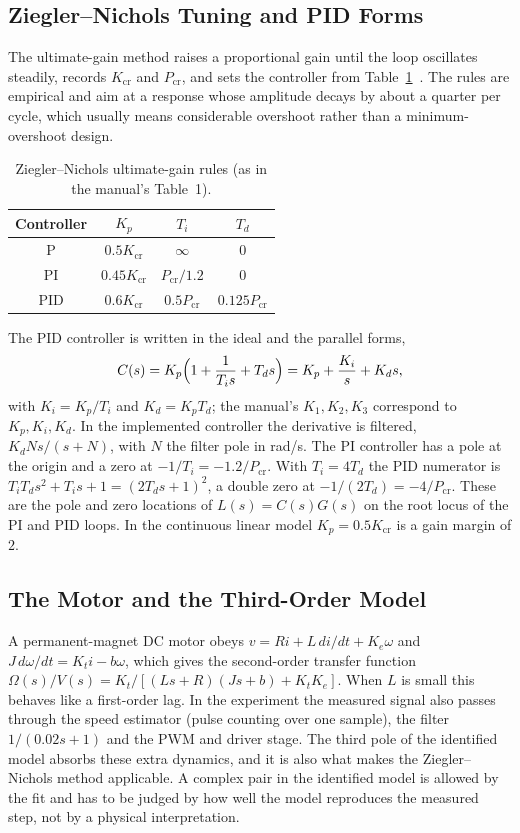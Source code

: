 \documentclass[lettersize,journal]{IEEEtran}
\newcommand{\Kcr}{K_{\mathrm{cr}}}
\newcommand{\Pcr}{P_{\mathrm{cr}}}
\begin{document}
\subsection{Ziegler--Nichols Tuning and PID Forms}
The ultimate-gain method raises a proportional gain until the loop oscillates steadily, records $\Kcr$ and $\Pcr$, and sets the controller from Table~\ref{tab:zn_rules}~\cite{zn,ogata}. The rules are empirical and aim at a response whose amplitude decays by about a quarter per cycle, which usually means considerable overshoot rather than a minimum-overshoot design.
\begin{table}[H]
\centering
\caption{Ziegler--Nichols ultimate-gain rules (as in the manual's Table~1).}
\label{tab:zn_rules}
\begin{tabular}{@{}cccc@{}}
\toprule
Controller & $K_p$ & $T_i$ & $T_d$ \\
\midrule
P   & $0.5\Kcr$  & $\infty$ & $0$ \\
PI  & $0.45\Kcr$ & $\Pcr/1.2$ & $0$ \\
PID & $0.6\Kcr$  & $0.5\Pcr$ & $0.125\Pcr$ \\
\bottomrule
\end{tabular}
\end{table}
The PID controller is written in the ideal and the parallel forms,
\begin{equation}
C(s)=K_p\Bigl(1+\frac{1}{T_is}+T_ds\Bigr)=K_p+\frac{K_i}{s}+K_ds,
\label{eq:pid}
\end{equation}
with $K_i=K_p/T_i$ and $K_d=K_pT_d$; the manual's $K_1,K_2,K_3$ correspond to $K_p,K_i,K_d$. In the implemented controller the derivative is filtered, $K_dNs/(s+N)$, with $N$ the filter pole in rad/s. The PI controller has a pole at the origin and a zero at $-1/T_i=-1.2/\Pcr$. With $T_i=4T_d$ the PID numerator is $T_iT_ds^2+T_is+1=(2T_ds+1)^2$, a double zero at $-1/(2T_d)=-4/\Pcr$. These are the pole and zero locations of $L(s)=C(s)G(s)$ on the root locus of the PI and PID loops. In the continuous linear model $K_p=0.5\Kcr$ is a gain margin of $2$.

\subsection{The Motor and the Third-Order Model}
A permanent-magnet DC motor obeys $v=Ri+L\,di/dt+K_e\omega$ and $J\,d\omega/dt=K_ti-b\omega$, which gives the second-order transfer function $\Omega(s)/V(s)=K_t/[(Ls+R)(Js+b)+K_tK_e]$. When $L$ is small this behaves like a first-order lag. In the experiment the measured signal also passes through the speed estimator (pulse counting over one sample), the filter $1/(0.02s+1)$ and the PWM and driver stage. The third pole of the identified model absorbs these extra dynamics, and it is also what makes the Ziegler--Nichols method applicable. A complex pair in the identified model is allowed by the fit and has to be judged by how well the model reproduces the measured step, not by a physical interpretation.
\end{document}
